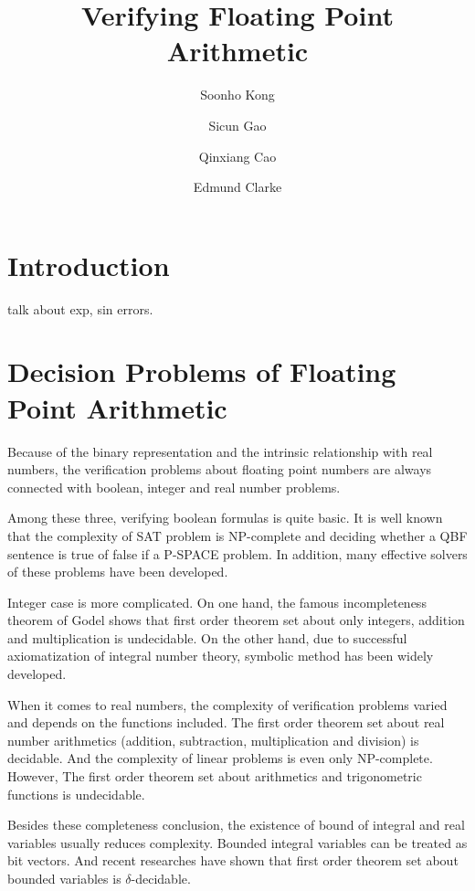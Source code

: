 \documentclass[12pt]{article}
\title{Verifying Floating Point Arithmetic}
\author{Soonho Kong \and Sicun Gao \and Qinxiang Cao \and Edmund Clarke}
\begin{document}
\maketitle

\begin{abstract}
 \end{abstract}




\section{Introduction}

talk about exp, sin errors. 


\section{Decision Problems of Floating Point Arithmetic}


Because of the binary representation and the intrinsic relationship with real numbers, the verification problems about floating point numbers are always connected with boolean, integer and real number problems.

Among these three, verifying boolean formulas is quite basic. It is well known that the complexity of SAT problem is NP-complete and deciding whether a QBF sentence is true of false if a P-SPACE problem. In addition, many effective solvers of these problems have been developed.

Integer case is more complicated. On one hand, the famous incompleteness theorem of Godel shows that first order theorem set about only integers, addition and multiplication is undecidable. On the other hand, due to successful axiomatization of integral number theory, symbolic method has been widely developed.

When it comes to real numbers, the complexity of verification problems varied and depends on the functions included. The first order theorem set about real number arithmetics (addition, subtraction, multiplication and division) is decidable. And the complexity of linear problems is even only NP-complete. However, The first order theorem set about arithmetics and trigonometric functions is undecidable.

Besides these completeness conclusion, the existence of bound of integral and real variables usually reduces complexity. Bounded integral variables can be treated as bit vectors. And recent researches have shown that first order theorem set about bounded variables is $\delta$-decidable.
\end{document}
